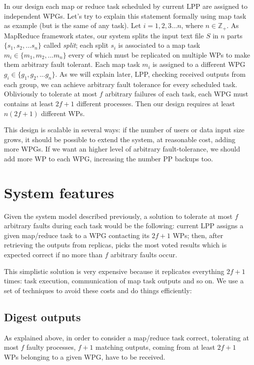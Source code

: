 \documentclass[sigchi]{acmart}
\begin{document}
In our design each map or reduce task scheduled by current LPP are assigned to independent WPGs. Let's try to explain this statement formally using map task as example (but is the same of any task). Let $i = 1,2,3...n$, where $n \in \mathbb{Z}_+$. As MapReduce framework states, our system splits the input text file $S$ in $n$ parts $\lbrace s_1, s_2, ... s_n \rbrace$ called \textit{split}; each split $s_i$ is associated to a map task $m_i \in \lbrace m_1, m_2, ... m_n \rbrace$ every of which must be replicated on multiple WPs to make them arbitrary fault tolerant. Each map task $m_i$ is assigned to a different WPG $g_i \in \lbrace g_1, g_2, ... g_n \rbrace$. As we will explain later, LPP, checking received outputs from each group, we can achieve arbitrary fault tolerance for every scheduled task. Obliviously to tolerate at most $f$ arbitrary failures of each task, each WPG must contains at least $2f+1$ different processes. Then our design requires at least $n(2f+1)$ different WPs.

This design is scalable in several ways: if the number of users or data input size grows, it should be possible to extend the system, at reasonable cost, adding more WPGs. If we want an higher level of arbitrary fault-tolerance, we should add more WP to each WPG, increasing the number PP backups too.

\section{System features}

Given the system model described previously, a solution to tolerate at most $f$ arbitrary faults during each task would be the following: current LPP assigns a given map/reduce task to a WPG contacting its $2f + 1$ WPs; then, after retrieving the outputs from replicas, picks the most voted results which is expected correct if no more than $f$ arbitrary faults occur. 

This simplistic solution is very expensive because it replicates everything $2f + 1$ times: task execution, communication of map task outputs and so on. We use a set of techniques to avoid these costs and do things efficiently:

\subsection{Digest outputs} As explained above, in order to consider a map/reduce task correct, tolerating at most $f$ faulty processes, $f + 1$ matching outputs, coming from at least $2f + 1$ WPs belonging to a given WPG,  have to be received. 
\end{document}
